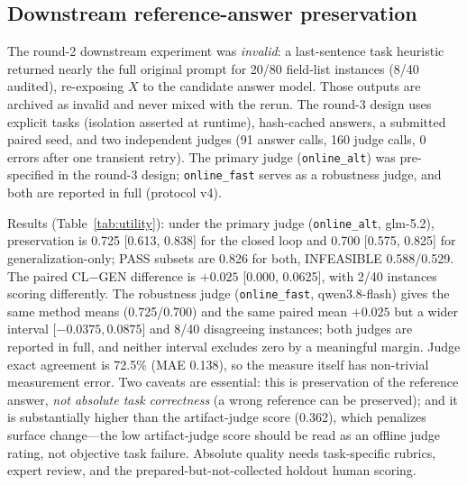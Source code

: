 \documentclass[11pt,a4paper]{article}
\begin{document}
\subsection{Downstream reference-answer preservation}\label{sec:res-down}
The round-2 downstream experiment was \emph{invalid}: a last-sentence task heuristic returned nearly the full original prompt for 20/80 field-list instances (8/40 audited), re-exposing $X$ to the candidate answer model. Those outputs are archived as invalid and never mixed with the rerun. The round-3 design uses explicit tasks (isolation asserted at runtime), hash-cached answers, a submitted paired seed, and two independent judges (91 answer calls, 160 judge calls, 0 errors after one transient retry). The primary judge (\texttt{online\_alt}) was pre-specified in the round-3 design; \texttt{online\_fast} serves as a robustness judge, and both are reported in full (protocol v4).

Results (Table~\ref{tab:utility}): under the primary judge (\texttt{online\_alt}, glm-5.2), preservation is 0.725 [0.613, 0.838] for the closed loop and 0.700 [0.575, 0.825] for generalization-only; PASS subsets are 0.826 for both, INFEASIBLE 0.588/0.529. The paired CL$-$GEN difference is $+0.025$ [0.000, 0.0625], with 2/40 instances scoring differently. The robustness judge (\texttt{online\_fast}, qwen3.8-flash) gives the same method means (0.725/0.700) and the same paired mean $+0.025$ but a wider interval [$-0.0375, 0.0875$] and 8/40 disagreeing instances; both judges are reported in full, and neither interval excludes zero by a meaningful margin. Judge exact agreement is 72.5\% (MAE 0.138), so the measure itself has non-trivial measurement error. Two caveats are essential: this is preservation of the reference answer, \emph{not absolute task correctness} (a wrong reference can be preserved); and it is substantially higher than the artifact-judge score (0.362), which penalizes surface change---the low artifact-judge score should be read as an offline judge rating, not objective task failure. Absolute quality needs task-specific rubrics, expert review, and the prepared-but-not-collected holdout human scoring.
\end{document}
